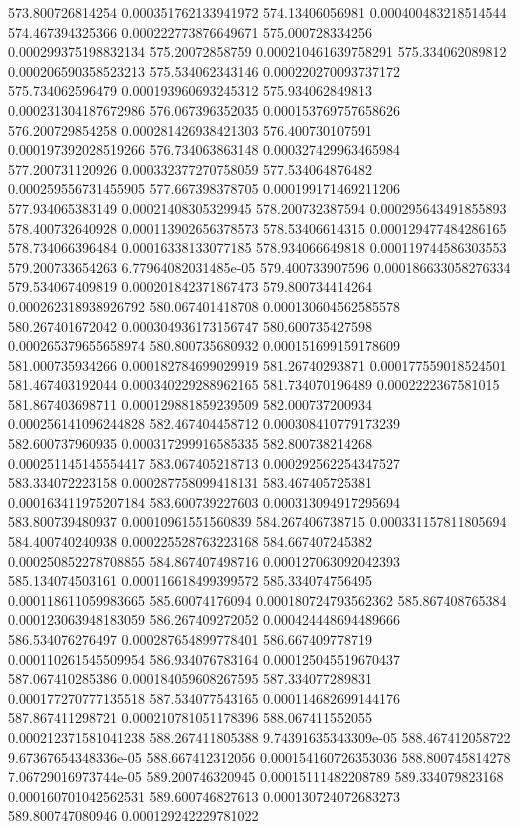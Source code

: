 {573.800726814254 0.000351762133941972
574.13406056981 0.000400483218514544
574.467394325366 0.000222773876649671
575.000728334256 0.000299375198832134
575.20072858759 0.000210461639758291
575.334062089812 0.000206590358523213
575.534062343146 0.000220270093737172
575.734062596479 0.000193960693245312
575.934062849813 0.000231304187672986
576.067396352035 0.000153769757658626
576.200729854258 0.000281426938421303
576.400730107591 0.000197392028519266
576.734063863148 0.000327429963465984
577.200731120926 0.000332377270758059
577.534064876482 0.000259556731455905
577.667398378705 0.000199171469211206
577.934065383149 0.00021408305329945
578.200732387594 0.000295643491855893
578.400732640928 0.000113902656378573
578.53406614315 0.000129477484286165
578.734066396484 0.00016338133077185
578.934066649818 0.000119744586303553
579.200733654263 6.77964082031485e-05
579.400733907596 0.000186633058276334
579.534067409819 0.000201842371867473
579.800734414264 0.000262318938926792
580.067401418708 0.000130604562585578
580.267401672042 0.000304936173156747
580.600735427598 0.000265379655658974
580.800735680932 0.000151699159178609
581.000735934266 0.000182784699029919
581.26740293871 0.000177559018524501
581.467403192044 0.000340229288962165
581.734070196489 0.0002222367581015
581.867403698711 0.000129881859239509
582.000737200934 0.000256141096244828
582.467404458712 0.000308410779173239
582.600737960935 0.000317299916585335
582.800738214268 0.000251145145554417
583.067405218713 0.000292562254347527
583.334072223158 0.000287758099418131
583.467405725381 0.000163411975207184
583.600739227603 0.000313094917295694
583.800739480937 0.00010961551560839
584.267406738715 0.000331157811805694
584.400740240938 0.000225528763223168
584.667407245382 0.000250852278708855
584.867407498716 0.000127063092042393
585.134074503161 0.000116618499399572
585.334074756495 0.000118611059983665
585.60074176094 0.000180724793562362
585.867408765384 0.000123063948183059
586.267409272052 0.000424448694489666
586.534076276497 0.000287654899778401
586.667409778719 0.000110261545509954
586.934076783164 0.000125045519670437
587.067410285386 0.000184059608267595
587.334077289831 0.000177270777135518
587.534077543165 0.000114682699144176
587.867411298721 0.000210781051178396
588.067411552055 0.000212371581041238
588.267411805388 9.74391635343309e-05
588.467412058722 9.67367654348336e-05
588.667412312056 0.000154160726353036
588.800745814278 7.06729016973744e-05
589.200746320945 0.00015111482208789
589.334079823168 0.000160701042562531
589.600746827613 0.000130724072683273
589.800747080946 0.000129242229781022
}
